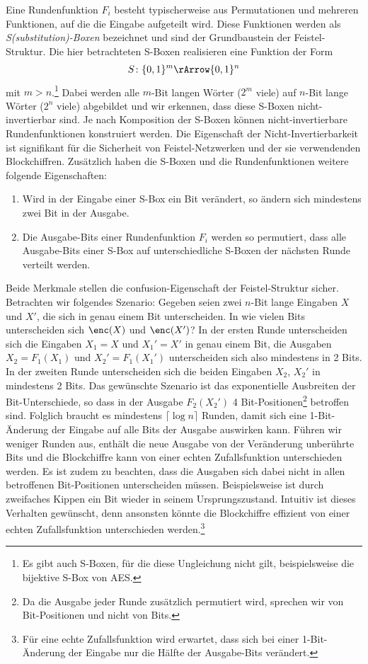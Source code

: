 Eine Rundenfunktion \(F_i\) besteht typischerweise aus Permutationen und mehreren Funktionen, auf die die Eingabe aufgeteilt wird. Diese Funktionen werden als \textit{S(substitution)-Boxen} bezeichnet und sind der Grundbaustein der Feistel-Struktur. Die hier betrachteten S-Boxen realisieren eine Funktion der Form
\begin{align*}
	S \colon \{0, 1\}^m \rArrow \{0, 1\}^n
\end{align*}
mit \(m > n\).\footnote{Es gibt auch S-Boxen, für die diese Ungleichung nicht gilt, beispielsweise die bijektive S-Box von AES.} Dabei werden alle $m$-Bit langen Wörter (\(2^m\) viele) auf $n$-Bit lange Wörter (\(2^n\) viele) abgebildet und wir erkennen, dass diese S-Boxen nicht-invertierbar sind. Je nach Komposition der S-Boxen können nicht-invertierbare Rundenfunktionen konstruiert werden. Die Eigenschaft der Nicht-Invertierbarkeit ist signifikant für die Sicherheit von Feistel-Netzwerken und der sie verwendenden Blockchiffren. Zusätzlich haben die S-Boxen und die Rundenfunktionen weitere folgende Eigenschaften:
\begin{enumerate}
	\item Wird in der Eingabe einer S-Box ein Bit verändert, so ändern sich mindestens zwei Bit in der Ausgabe.
	\item Die Ausgabe-Bits einer Rundenfunktion $F_i$ werden so permutiert, dass alle Ausgabe-Bits einer S-Box auf unterschiedliche S-Boxen der nächsten Runde verteilt werden.
\end{enumerate}
Beide Merkmale stellen die confusion-Eigenschaft der Feistel-Struktur sicher. 
Betrachten wir folgendes Szenario: Gegeben seien zwei $n$-Bit lange Eingaben $X$ und $X'$, die sich in genau einem Bit unterscheiden. In wie vielen Bits unterscheiden sich $\enc(X)$ und $\enc(X')$? In der ersten Runde unterscheiden sich die Eingaben $X_1 = X$ und $X_1' = X'$ in genau einem Bit, die Ausgaben $X_2 = F_1(X_1)$ und $X_2' = F_1(X_1')$ unterscheiden sich also mindestens in 2 Bits. In der zweiten Runde unterscheiden sich die beiden Eingaben $X_2$, $X_2'$ in mindestens 2 Bits. Das gewünschte Szenario ist das exponentielle Ausbreiten der Bit-Unterschiede, so dass in der Ausgabe $F_2(X_2')$ 4 Bit-Positionen\footnote{Da die Ausgabe jeder Runde zusätzlich permutiert wird, sprechen wir von Bit-Positionen und nicht von Bits.} betroffen sind. Folglich braucht es mindestens $\lceil \log n \rceil$ Runden, damit sich eine 1-Bit-Änderung der Eingabe auf alle Bits der Ausgabe auswirken kann. Führen wir weniger Runden aus, enthält die neue Ausgabe von der Veränderung unberührte Bits und die Blockchiffre kann von einer echten Zufallsfunktion unterschieden werden. Es ist zudem zu beachten, dass die Ausgaben sich dabei nicht in allen betroffenen Bit-Positionen unterscheiden müssen. Beispielsweise ist durch zweifaches Kippen ein Bit wieder in seinem Ursprungszustand. Intuitiv ist dieses Verhalten gewünscht, denn ansonsten könnte die Blockchiffre effizient von einer echten Zufallsfunktion unterschieden werden.\footnote{Für eine echte Zufallsfunktion wird erwartet, dass sich bei einer 1-Bit-Änderung der Eingabe nur die Hälfte der Ausgabe-Bits verändert.}

